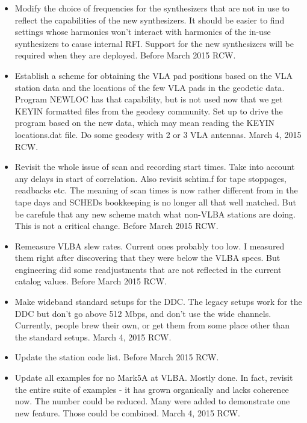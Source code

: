 \documentclass{report}
\begin{document}
\begin{itemize}
\item Modify the choice of frequencies for the synthesizers that are not in
      use to reflect the capabilities of the new synthesizers.
      It should be easier to find settings whose harmonics won't interact
      with harmonics of the in-use synthesizers to cause internal RFI.
      Support for the new synthesizers will be required when they are 
      deployed.  Before March 2015  RCW.

\item Establish a scheme for obtaining the VLA pad positions based on the
      VLA station data and the locations of the few VLA pads in the geodetic
      data.  Program NEWLOC has that capability, but is not used now that
      we get KEYIN formatted files from the geodesy community.  Set up to
      drive the program based on the new data, which may mean reading the
      KEYIN locations.dat file.  Do some geodesy with 2 or 3 VLA antennas.
      March 4, 2015  RCW.

\item Revisit the whole issue of scan and recording start times.  Take
      into account any delays in start of correlation.  Also revisit 
      schtim.f for tape stoppages, readbacks etc.  The meaning of scan 
      times is now rather different from in the tape days and SCHEDs 
      bookkeeping is no longer all that well matched.  But be carefule 
      that any new scheme match what non-VLBA stations are doing.  This
      is not a critical change.  Before March 2015  RCW.

\item Remeasure VLBA slew rates.  Current ones probably too low.  I
      measured them right after discovering that they were below the VLBA
      specs.  But engineering did some readjustments that are not 
      reflected in the current catalog values. Before March 2015  RCW.

\item Make wideband standard setups for the DDC.  The legacy setups work
      for the DDC but don't go above 512 Mbps, and don't use the wide
      channels.  Currently, people brew their own, or get them from 
      some place other than the standard setups.  March 4, 2015  RCW.

\item Update the station code list. Before March 2015  RCW.

\item Update all examples for no Mark5A at VLBA. Mostly done.  In fact,
      revisit the entire suite of examples - it has grown organically 
      and lacks coherence now.  The number could be reduced.  Many were 
      added to demonstrate one new feature.  Those could be combined.  
      March 4, 2015  RCW.


\end{itemize}
\end{document}
